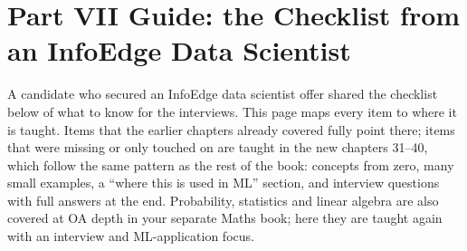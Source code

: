 \chapter*{Part VII Guide: the Checklist from an InfoEdge Data Scientist}

A candidate who secured an InfoEdge data scientist offer shared the checklist below of what to know for the interviews. This page maps every item to
where it is taught. Items that the earlier chapters already covered fully point there; items that were missing or only touched on are taught in the
new chapters 31--40, which follow the same pattern as the rest of the book: concepts from zero, many small examples, a ``where this is used in ML''
section, and interview questions with full answers at the end. Probability, statistics and linear algebra are also covered at OA depth in your
separate Maths book; here they are taught again with an interview and ML-application focus.

